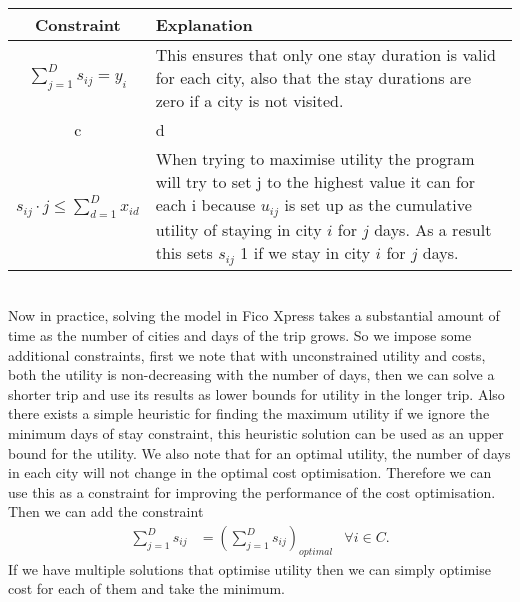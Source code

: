 \documentclass[12pt]{article}
\begin{document}
\begin{tabular}{c|p{11cm}}
\hline
Constraint &  Explanation \\
\hline
$\sum_{j=1}^{D} s_{ij} = y_{i}$ & This ensures that only one stay duration is valid for each city, also that the stay durations are zero if a city is not visited. \\
c & d \\
\hline
$s_{ij} \cdot j \leq \sum_{d=1}^{D} x_{id}$ & When trying to maximise utility the program will try to set j to the highest value it can for each i because $u_{ij}$ is set up as the cumulative utility of staying in city $i$ for $j$ days. As a result this sets $s_{ij}$ 1 if we stay in city $i$ for $j$ days. \\
\end{tabular}
\vspace{5mm}\\

Now in practice, solving the model in Fico Xpress takes a substantial amount of time as the number of cities and days of the trip grows. So we impose some additional constraints, first we note that with unconstrained utility and costs, both the utility is non-decreasing with the number of days, then we can solve a shorter trip and use its results as lower bounds for utility in the longer trip. Also there exists a simple heuristic for finding the maximum utility if we ignore the minimum days of stay constraint, this heuristic solution can be used as an upper bound for the utility. We also note that for an optimal utility, the number of days in each city will not change in the optimal cost optimisation. Therefore we can use this as a constraint for improving the performance of the cost optimisation. Then we can add the constraint
\begin{align*}
	\sum\limits_{j=1}^D s_{ij} &= (\sum\limits_{j=1}^D s_{ij})_{optimal} & \forall i \in C.
\end{align*}
If we have multiple solutions that optimise utility then we can simply optimise cost for each of them and take the minimum.
\end{document}
